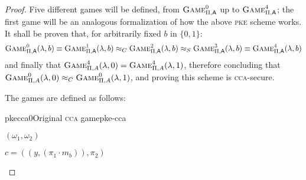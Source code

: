 \begin{proof}
    Five different games will be defined, from $\cryptog{0}$ up to $\cryptog{4}$; the first game will be an analogous formalization of how the above \textsc{pke} scheme works. It shall be proven that, for arbitrarily fixed $b$ in $\{0, 1\}$:
    \[
        \cryptog{0}(\lambda, b) \equiv \cryptog{1}(\lambda, b) \approx_C \cryptog{2}(\lambda, b) \approx_S \cryptog{3}(\lambda, b) \equiv \cryptog{4}(\lambda, b)
    \]
    and finally that $\textsc{Game}_{\Pi, A}^4(\lambda, 0) = \textsc{Game}_{\Pi, A}^4(\lambda, 1)$, therefore concluding that $\textsc{Game}_{\Pi, A}^0(\lambda, 0) \approx_C \textsc{Game}_{\Pi, A}^0(\lambda, 1)$, and proving this scheme is \textsc{cca}-secure.


    The games are defined as follows:

    \begin{cryptogame}{pkecca0}{Original \textsc{cca} game}{pke-cca}
    
        {$(\omega_1, \omega_2)$}
        {}
    
        \send{}{}{}
        \receive{}{}{}
    
        \postlevel
    
        {$c = ((y, (\pi_1 \cdot m_b)), \pi_2)$}
        {}
    
        \postlevel
    
        \send{}{}{}
        \receive{}{}{}
    
        \postlevel
    
    

\end{cryptogame}
\end{proof}
